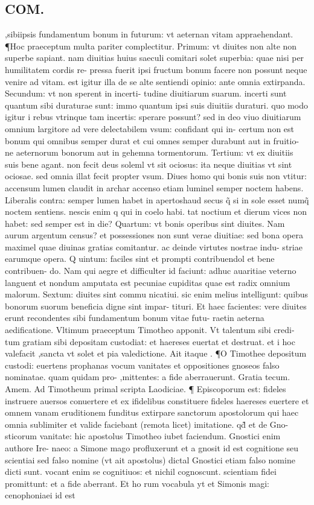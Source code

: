 \documentclass{article}
\begin{document}
\begin{pages}
\section*{COM. }
\marginpar{[ p.6 ]}\pstart ,sibiipsis fundamentum bonum in futurum: vt aeternan vitam appraehendant. ¶Hoc praeceptum multa pariter complectitur. Primum: vt diuites non alte non superbe sapiant. nam diuitias huius saeculi comitari solet superbia: quae nisi per humilitatem cordis re- pressa fuerit ipsi fructum bonum facere non possunt neque venire ad vitam. est igitur illa de se alte sentiendi opinio: ante omnia extirpanda. Secundum: vt non sperent in incerti- tudine diuitiarum suarum. incerti sunt quantum sibi duraturae sunt: immo quantum ipsi suis diuitiis duraturi. quo modo igitur i rebus vtrinque tam incertis: sperare possunt? sed in deo viuo diuitiarum omnium largitore ad vere delectabilem vsum: confidant qui in- certum non est bonum qui omnibus semper durat et cui omnes semper durabunt aut in fruitio- ne aeternorum bonorum aut in gehemna tormentorum. Tertium: vt ex diuitiis suis bene agant. non fecit deus soleml vt sit ociosus: ita neque diuitias vt sint ociosae. sed omnia illat fecit propter vsum. Diues homo qui bonis suis non vtitur: accensum lumen claudit in archar accenso etiam luminel semper noctem habens. Liberalis contra: semper lumen habet in apertoshaud secus q̃ si in sole esset numq̃ noctem sentiens. nescis enim q qui in coelo habi. tat noctium et dierum vices non habet: sed semper est in die? Quartum: vt bonis operibus sint diuites. Nam aurum argentum census? et possessiones non sunt verae diuitiae: sed bona opera maximel quae diuinas gratias comitantur. ac deinde virtutes nostrae indu- striae earumque opera. Q uintum: faciles sint et prompti contribuendol et bene contribuen- do. Nam qui aegre et difficulter id faciunt: adhuc auaritiae veterno languent et nondum amputata est pecuniae cupiditas quae est radix omnium malorum. Sextum: diuites sint commu nicatiui. sic enim melius intelligunt: quibus bonorum suorum beneficia digne sint impar- tituri. Et haec facientes: vere diuites erunt recondentes sibi fundamentum bonum vitae futu- raetin aeterna aedificatione. Vltimum praeceptum Timotheo apponit. Vt talentum sibi credi- tum gratiam sibi depositam custodiat: et haereses euertat et destruat. et i hoc valefacit ,sancta vt solet et pia valedictione. Ait itaque . ¶O Timothee depositum custodi: euertens  prophanas vocum vanitates et oppositiones gnoseos falso nominatae. quam quidam pro- ,mittentes: a fide aberrauerunt. Gratia tecum. Amem. Ad Timotheum primal scripta Laodiciae. ¶ Episcoporum est: fideles instruere auersos conuertere et ex ifidelibus constituere fideles  haereses euertere et omnem vanam eruditionem funditus extirpare sanctorum apostolorum qui haec omnia sublimiter et valide faciebant (remota licet) imitatione. qd̃ et de Gno- sticorum vanitate: hic apostolus Timotheo iubet faciendum. Gnostici enim authore Ire- naeo: a Simone mago profluxerunt et a gnosit id est cognitione seu scientiai sed falso nomine (vt ait apostolus) dictal Gnostici etiam falso nomine dicti sunt. vocant enim se cognitiuos: et nichil cognoscunt. scientiam fidei promittunt: et a fide aberrant. Et ho rum vocabula yt et Simonis magi: cenophoniaei id est 
\end{pages}
\end{document}
